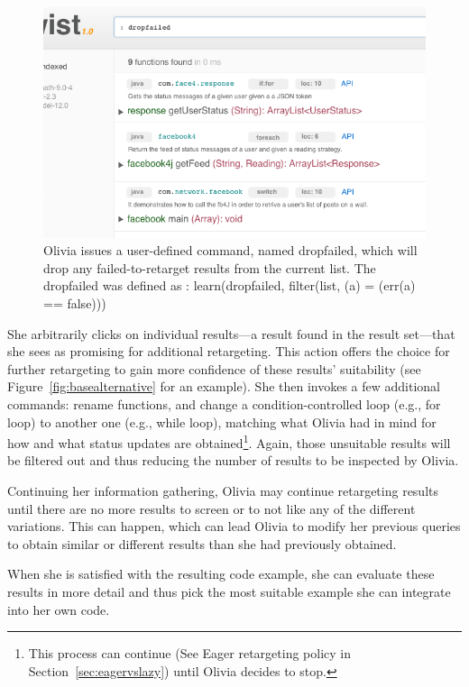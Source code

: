 \begin{figure}[!ht]
    \centering
    \includegraphics[width=\textwidth]{images/twistclean}
    \caption{Olivia issues a user-defined command, named dropfailed, which will drop 
	 any failed-to-retarget results from the current list. The dropfailed was defined as : learn(dropfailed, 
	 filter(list, (a) = (err(a) == false)))}
    \label{fig:twistclean}
\end{figure}   

She arbitrarily clicks on individual results---a result found in the result set---that she sees as promising for additional retargeting. This action offers the choice for further retargeting to gain more confidence of these results' suitability (see Figure~\ref{fig:basealternative} for an example). She then invokes a few additional commands: rename functions, and change a condition-controlled loop (e.g., for loop) to another one (e.g., while loop), matching what Olivia had in mind for how and what status updates are obtained\footnote{This process can continue (See Eager retargeting policy in Section~\ref{sec:eagervslazy}) until Olivia decides to stop.}. Again, those unsuitable results will be filtered out and thus reducing the number of results to be inspected by Olivia.

Continuing her information gathering, Olivia may continue retargeting results until there are no more results to screen or to not like any of the different variations. This can happen, which can lead Olivia to modify her previous queries to obtain similar or different results than she had previously obtained.

When she is satisfied with the resulting code example, she can evaluate these results in more detail and thus pick the most suitable example she can integrate into her own code.

